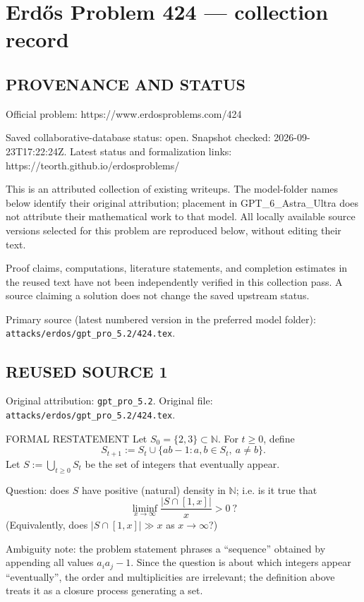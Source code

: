 \section*{Erd\H{o}s Problem 424 --- collection record}

\subsection*{PROVENANCE AND STATUS}
Official problem: https://www.erdosproblems.com/424

Saved collaborative-database status: open.
Snapshot checked: 2026-09-23T17:22:24Z.
Latest status and formalization links: https://teorth.github.io/erdosproblems/

This is an attributed collection of existing writeups. The model-folder names below identify their original attribution; placement in GPT\_6\_Astra\_Ultra does not attribute their mathematical work to that model. All locally available source versions selected for this problem are reproduced below, without editing their text.

Proof claims, computations, literature statements, and completion estimates in the reused text have not been independently verified in this collection pass. A source claiming a solution does not change the saved upstream status.

Primary source (latest numbered version in the preferred model folder): \texttt{attacks/erdos/gpt\_pro\_5.2/424.tex}.

\subsection*{REUSED SOURCE 1}
Original attribution: \texttt{gpt\_pro\_5.2}.
Original file: \texttt{attacks/erdos/gpt\_pro\_5.2/424.tex}.


FORMAL RESTATEMENT
Let $S_0=\{2,3\}\subset\mathbb N$. For $t\ge 0$, define
\[
 S_{t+1}:=S_t\cup\{ab-1: a,b\in S_t,\ a\ne b\}.
\]
Let $S:=\bigcup_{t\ge 0}S_t$ be the set of integers that eventually appear.

Question: does $S$ have positive (natural) density in $\mathbb N$; i.e. is it true that
\[
 \liminf_{x\to\infty}\frac{|S\cap[1,x]|}{x}>0\ ?
\]
(Equivalently, does $|S\cap[1,x]|\gg x$ as $x\to\infty$?)

Ambiguity note: the problem statement phrases a “sequence” obtained by appending all values $a_ia_j-1$. Since the question is about which integers appear “eventually”, the order and multiplicities are irrelevant; the definition above treats it as a closure process generating a set.


